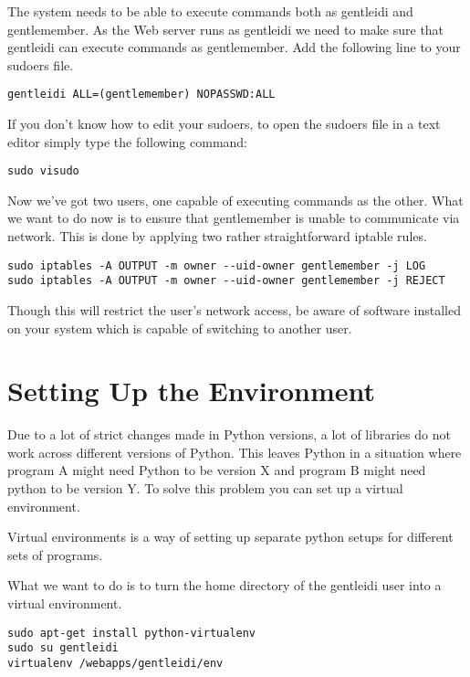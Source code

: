 The system needs to be able to execute commands both as gentleidi and
gentlemember. As the Web server runs as gentleidi we need to make sure
that gentleidi can execute commands as gentlemember. Add the following
line to your sudoers file.\

\begin{verbatim}
gentleidi ALL=(gentlemember) NOPASSWD:ALL
\end{verbatim}

If you don't know how to edit your sudoers, to open the
sudoers file in a text editor simply type the following command:

\begin{verbatim}
sudo visudo
\end{verbatim}

Now we've got two users, one capable of executing
commands as the other. What we want to do now is to ensure that
gentlemember is unable to communicate via network. This is done by
applying two rather straightforward iptable rules.

\begin{verbatim}
sudo iptables -A OUTPUT -m owner --uid-owner gentlemember -j LOG
sudo iptables -A OUTPUT -m owner --uid-owner gentlemember -j REJECT
\end{verbatim}

Though this will restrict the user's network access, be
aware of software installed on your system which is capable of
switching to another user.

\section{Setting Up the Environment}

Due to a lot of strict changes made in Python versions, a lot of
libraries do not work across different versions of Python. This leaves
Python in a situation where program A might need Python to be version X
and program B might need python to be version Y. To solve this problem 
you can set up a virtual environment.

Virtual environments is a way of setting up separate python setups for
different sets of programs.

What we want to do is to turn the home directory of the gentleidi user
into a virtual environment.

\begin{verbatim}
sudo apt-get install python-virtualenv
sudo su gentleidi
virtualenv /webapps/gentleidi/env
\end{verbatim}

